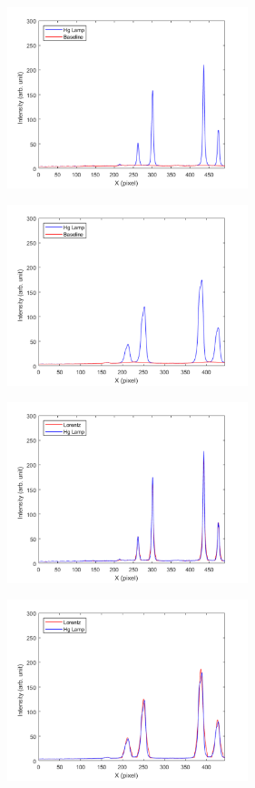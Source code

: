 \begin{figure}[H]
	\centering
	\begin{subfigure}[fig nice]{0.49\textwidth}
		\includegraphics[width=7cm]{figures/nice_hg_base.png}
		\caption{}
		\label{fig:a21}
	\end{subfigure}
	\begin{subfigure}[fig nice]{0.49\textwidth}
		\includegraphics[width=7cm]{figures/bad_hg_base.png}
		\caption{}
		\label{fig:b22}
	\end{subfigure}
\begin{subfigure}[fig nice]{0.49\textwidth}
	\includegraphics[width=7cm]{figures/nice_hg_lorentz.png}
	\caption{}
	\label{fig:a23}
\end{subfigure}
\begin{subfigure}[fig nice]{0.49\textwidth}
	\includegraphics[width=7cm]{figures/bad_hg_lorentz.png}

\end{subfigure}
\end{figure}
